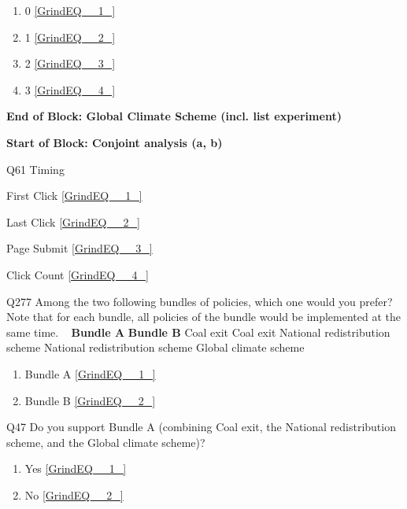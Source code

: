 \documentclass{article} %
\begin{document}
\begin{enumerate}
\item  0  \eqref{GrindEQ__1_} 

\item  1  \eqref{GrindEQ__2_} 

\item  2  \eqref{GrindEQ__3_} 

\item  3  \eqref{GrindEQ__4_} 
\end{enumerate}

\noindent 

\noindent \textbf{End of Block: Global Climate Scheme (incl. list experiment)}

\noindent \textbf{}

\noindent \textbf{Start of Block: Conjoint analysis (a, b)}

\noindent 

\noindent Q61 Timing

\noindent First Click  \eqref{GrindEQ__1_}

\noindent Last Click  \eqref{GrindEQ__2_}

\noindent Page Submit  \eqref{GrindEQ__3_}

\noindent Click Count  \eqref{GrindEQ__4_}

\noindent 

\noindent 

\noindent 

\noindent Q277 Among the two following bundles of policies, which one would you prefer?  Note that for each bundle, all policies of the bundle would be implemented at the same time. ~          \textbf{Bundle A}    \textbf{Bundle B}          Coal exit    Coal exit          National redistribution scheme    National redistribution scheme          Global climate scheme           

\begin{enumerate}
\item  Bundle A  \eqref{GrindEQ__1_} 

\item  Bundle B  \eqref{GrindEQ__2_} 
\end{enumerate}

\noindent 

\noindent 

\noindent 

\noindent Q47 Do you support Bundle A (combining Coal exit, the National redistribution scheme, and the Global climate scheme)?

\begin{enumerate}
\item  Yes  \eqref{GrindEQ__1_} 

\item  No  \eqref{GrindEQ__2_} 
\end{enumerate}
\end{document}
